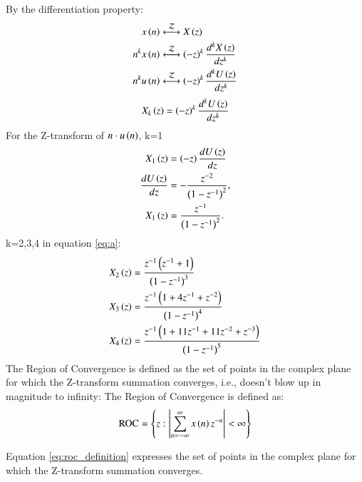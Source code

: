 \documentclass[journal,12pt,twocolumn]{IEEEtran}
\theoremstyle{remark}
\begin{document}
\begin{enumerate}
By the differentiation property:\\
\begin{align}
x\left(n\right) &\stackrel{\mathcal{Z}}{\longleftrightarrow} X\left(z\right)\\
n^k x\left(n\right) &\stackrel{\mathcal{Z}}{\longleftrightarrow} \left(-z\right)^k \frac{d^kX\left(z\right)}{dz^k}\\
n^k u\left(n\right) &\stackrel{\mathcal{Z}}{\longleftrightarrow} \left(-z\right)^k \frac{d^kU\left(z\right)}{dz^k}
\end{align}
\begin{align} \label{eq:a}
    X_k\left(z\right) =  \left(-z\right)^k \frac{d^kU\left(z\right)}{dz^k}
\end{align}
For the Z-transform of $n \cdot u\left(n\right)$, 
 k=1 
\begin{align}
    X_1\left(z\right) &=  \left(-z\right) \frac{dU\left(z\right)}{dz}\\
    \frac{dU\left(z\right)}{dz} &= -\frac{z^{-2}}{\left(1-z^{-1}\right)^2}, \\
    X_1\left(z\right) &= \frac{z^{-1}}{\left(1-z^{-1}\right)^2}.
\end{align}
 k=2,3,4 in equation \eqref{eq:a}:
\begin{align}
     X_2\left(z\right) &= \frac{z^{-1}\left(z^{-1}+1\right)}{\left(1-z^{-1}\right)^3}\\
     X_3\left(z\right) &= \frac{z^{-1}\left(1+4z^{-1}+z^{-2}\right)}{\left(1-z^{-1}\right)^4}\\
    X_4\left(z\right) &= \frac{z^{-1}\left(1+11z^{-1}+11z^{-2}+z^{-3}\right)}{\left(1-z^{-1}\right)^5} 
\end{align}
The Region of Convergence  is defined as the set of points in the complex plane for which the Z-transform summation converges, i.e., doesn't blow up in magnitude to infinity:
The Region of Convergence  is defined as:
\begin{equation}\label{eq:roc_definition}
    \text{ROC} = \left\{ z : \left| \sum_{n=-\infty}^{\infty} x\left(n\right)z^{-n} \right| < \infty \right\}
\end{equation}

Equation \eqref{eq:roc_definition} expresses the set of points in the complex plane for which the Z-transform summation converges.


\end{enumerate}
\end{document}
